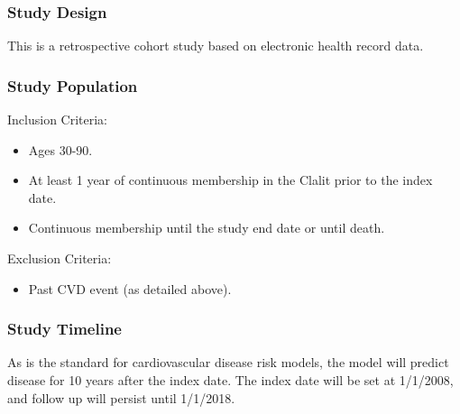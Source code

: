 \documentclass[a4paper,12pt]{article}
\begin{document}
		\subsubsection*{Study Design}
		This is a retrospective cohort study based on electronic health record data.
		
		\subsubsection*{Study Population}
		Inclusion Criteria:
		\begin{itemize}
			\item Ages 30-90.
			\item At least 1 year of continuous membership in the Clalit prior to the index date.
			\item Continuous membership until the study end date or until death.
		\end{itemize}
		
		Exclusion Criteria:
		\begin{itemize}
			\item Past CVD event (as detailed above).
		\end{itemize}
		
		\subsubsection*{Study Timeline}
		As is the standard for cardiovascular disease risk models, the model will predict disease for 10 years after the index date. The index date will be set at 1/1/2008, and follow up will persist until 1/1/2018.
		
\end{document}
